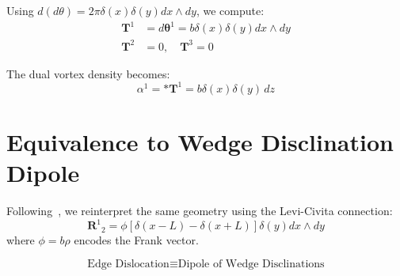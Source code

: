 Using $d(d\theta) = 2\pi \delta(x)\delta(y) dx \wedge dy$, we compute:
\begin{align}
    \mathbf{T}^1 &= d\boldsymbol{\theta}^1 = b \delta(x) \delta(y) dx \wedge dy \\
    \mathbf{T}^2 &= 0, \quad \mathbf{T}^3 = 0
\end{align}

The dual vortex density becomes:
\begin{equation}
    \alpha^1 = *\mathbf{T}^1 = b \delta(x)\delta(y) \, dz
\end{equation}

\section{Equivalence to Wedge Disclination Dipole}

Following~\cite{kobayashi2025}, we reinterpret the same geometry using the Levi-Civita connection:
\begin{equation}
    \mathbf{R}^1{}_2 = \phi [\delta(x - L) - \delta(x + L)] \delta(y) dx \wedge dy
\end{equation}
where $\phi = b \rho$ encodes the Frank vector.

\begin{equation}
    \boxed{\text{Edge Dislocation} \equiv \text{Dipole of Wedge Disclinations}}
\end{equation}